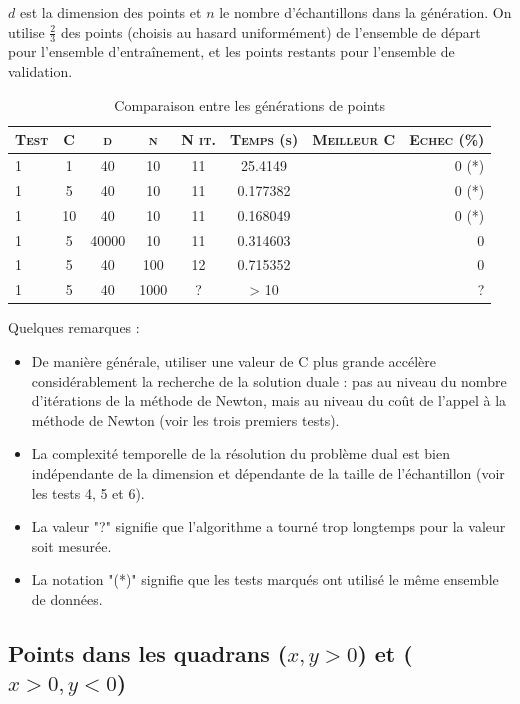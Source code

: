 \documentclass{article}
\begin{document}
$d$ est la dimension des points et $n$ le nombre d'échantillons dans la génération. On utilise $\frac{2}{3}$ des points (choisis au hasard uniformément) de l'ensemble de départ pour l'ensemble d'entraînement, et les points restants pour l'ensemble de validation. \\

     \begin{table}[H]
       \caption{Comparaison entre les générations de points}
       \begin{tabular}{|l|c|c|c|c|c|c|r|}
         \hline
         \textsc{Test} & \textsc{C} & \textsc{d} & \textsc{n} & \textsc{N it.} & \textsc{Temps (s)} & \textsc{Meilleur C} & \textsc{Echec (\%)}\\
         \hline
         1 & 1 & 40 & 10 & 11 & 25.4149 &  & 0 (*)\\
         \hline
         1 & 5 & 40 & 10 & 11 & 0.177382 &  & 0 (*)\\
         \hline
         1 & 10 & 40 & 10 & 11 & 0.168049 &  & 0 (*)\\
         \hline
         1 & 5 & 40000 & 10 & 11 & 0.314603 &  & 0\\
         \hline
         1 & 5 & 40 & 100 & 12 & 0.715352 &  & 0\\
         \hline
         1 & 5 & 40 & 1000 & ? & > 10 &  & ?\\
         \hline
       \end{tabular}
     \end{table}

Quelques remarques :
\begin{itemize}
\item De manière générale, utiliser une valeur de C plus grande accélère considérablement la recherche de la solution duale : pas au niveau du nombre d'itérations de la méthode de Newton, mais au niveau du coût de l'appel à la méthode de Newton (voir les trois premiers tests). 
\item La complexité temporelle de la résolution du problème dual est bien indépendante de la dimension et dépendante de la taille de l'échantillon (voir les tests 4, 5 et 6).
\item La valeur "?" signifie que l'algorithme a tourné trop longtemps pour la valeur soit mesurée.
\item La notation "(*)" signifie que les tests marqués ont utilisé le même ensemble de données.
\end{itemize}

\subsection{Points dans les quadrans ($x, y > 0$) et ($x > 0, y < 0$)}
\end{document}
